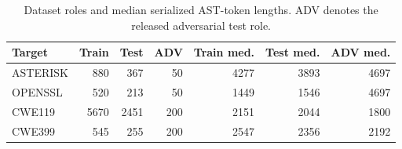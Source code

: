 \begin{table}[t]
\centering
\caption{Dataset roles and median serialized AST-token lengths. ADV denotes the released adversarial test role.}
\label{tab:dataset-profile}
\scriptsize
\begin{tabular}{lrrrrrr}
\toprule
Target & Train & Test & ADV & Train med. & Test med. & ADV med. \\ 
\midrule
ASTERISK & 880 & 367 & 50 & 4277 & 3893 & 4697 \\
OPENSSL & 520 & 213 & 50 & 1449 & 1546 & 4697 \\
CWE119 & 5670 & 2451 & 200 & 2151 & 2044 & 1800 \\
CWE399 & 545 & 255 & 200 & 2547 & 2356 & 2192 \\
\bottomrule
\end{tabular}
\end{table}

